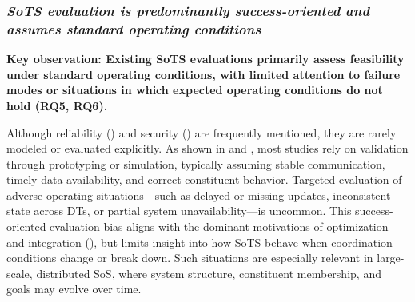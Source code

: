 





\subsubsection{\textit{SoTS evaluation is predominantly success-oriented and assumes standard operating conditions}}

\textbf{Key observation: Existing SoTS evaluations primarily assess feasibility under standard operating conditions, with limited attention to failure modes or situations in which expected operating conditions do not hold (RQ5, RQ6).}

Although reliability () and security () are frequently mentioned, they are rarely modeled or evaluated explicitly. As shown in  and , most studies rely on validation through prototyping or simulation, typically assuming stable communication, timely data availability, and correct constituent behavior. Targeted evaluation of adverse operating situations---such as delayed or missing updates, inconsistent state across DTs, or partial system unavailability---is uncommon. This success-oriented evaluation bias aligns with the dominant motivations of optimization and integration (), but limits insight into how SoTS behave when coordination conditions change or break down. Such situations are especially relevant in large-scale, distributed SoS, where system structure, constituent membership, and goals may evolve over time.

